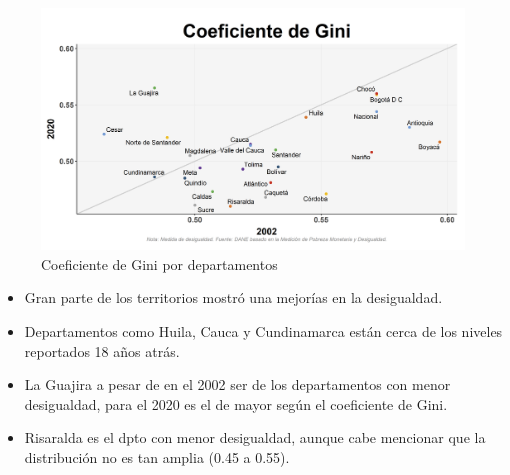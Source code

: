     \begin{figure}[H]
        \caption{Coeficiente de Gini por departamentos \label{map_result_2} }
        \begin{center}
        \includegraphics[width=\textwidth,keepaspectratio]{img/var_254_scatter_time.png}
        \end{center}
    \end{figure}
            \begin{itemize}
                    \item Gran parte de los territorios mostró una mejorías en la desigualdad.
                    \item Departamentos como Huila, Cauca y Cundinamarca están cerca de los niveles reportados 18 años atrás.
                    \item La Guajira a pesar de en el 2002 ser de los departamentos con menor desigualdad, para el 2020 es el de mayor según el coeficiente de Gini.
                    \item Risaralda es el dpto con menor desigualdad, aunque cabe mencionar que la distribución no es tan amplia (0.45 a 0.55).
                    \end{itemize}

